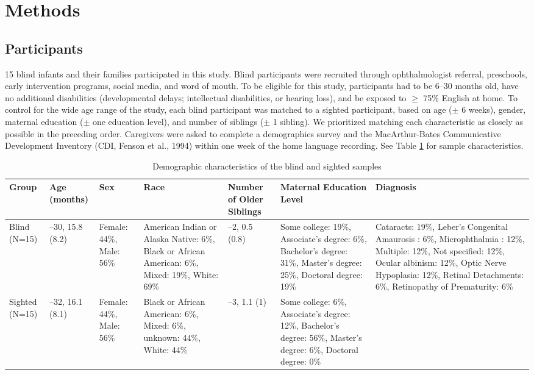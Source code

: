 \documentclass[
  man]{apa6}
\begin{document}
\hypertarget{methods}{%
\section{Methods}\label{methods}}

\hypertarget{participants}{%
\subsection{Participants}\label{participants}}

15 blind infants and their families participated in this study. Blind participants were recruited through ophthalmologist referral, preschools, early intervention programs, social media, and word of mouth. To be eligible for this study, participants had to be 6--30 months old, have no additional disabilities (developmental delays; intellectual disabilities, or hearing loss), and be exposed to \(\geq\) 75\% English at home. To control for the wide age range of the study, each blind participant was matched to a sighted participant, based on age (\(\pm\) 6 weeks), gender, maternal education (\(\pm\) one education level), and number of siblings (\(\pm\) 1 sibling). We prioritized matching each characteristic as closely as possible in the preceding order. Caregivers were asked to complete a demographics survey and the MacArthur-Bates Communicative Development Inventory (CDI, Fenson et al., 1994) within one week of the home language recording. See Table \ref{tab:participant-characteristics} for sample characteristics.

\begin{table}

\caption{\label{tab:participant-characteristics}Demographic characteristics of the blind and sighted samples}
\centering
\fontsize{8}{10}\selectfont
\begin{tabular}[t]{>{\raggedright\arraybackslash}p{.4in}|>{\raggedright\arraybackslash}p{.5in}|>{\raggedright\arraybackslash}p{.7in}|>{\raggedright\arraybackslash}p{.75in}|>{\raggedright\arraybackslash}p{.75in}|>{\raggedright\arraybackslash}p{1in}|>{\raggedright\arraybackslash}p{1.5in}}
\hline
Group & Age (months) & Sex & Race & Number of Older Siblings & Maternal Education Level & Diagnosis\\
\hline
Blind (N=15) & 6--30,
15.8 (8.2) & Female: 44\%,
Male: 56\% & American Indian or Alaska Native: 6\%,
Black or African American: 6\%,
Mixed: 19\%,
White: 69\% & 0--2,
0.5 (0.8) & Some college: 19\%,
Associate's degree: 6\%,
Bachelor's degree: 31\%,
Master's degree: 25\%,
Doctoral degree: 19\% & Cataracts: 19\%,
Leber's Congenital Amaurosis : 6\%,
Microphthalmia : 12\%,
Multiple: 12\%,
Not specified: 12\%,
Ocular albinism: 12\%,
Optic Nerve Hypoplasia: 12\%,
Retinal Detachments: 6\%,
Retinopathy of Prematurity: 6\%\\
\hline
Sighted (N=15) & 6--32,
16.1 (8.1) & Female: 44\%,
Male: 56\% & Black or African American: 6\%,
Mixed: 6\%,
unknown: 44\%,
White: 44\% & 0--3,
1.1 (1) & Some college: 6\%,
Associate's degree: 12\%,
Bachelor's degree: 56\%,
Master's degree: 6\%,
Doctoral degree: 0\% & \\
\hline
\end{tabular}
\end{table}
\end{document}
